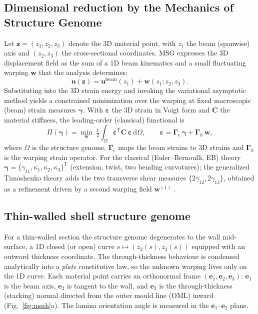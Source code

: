 \documentclass[preprint,12pt]{elsarticle}
\newcommand{\bz}{\bm{z}}
\newcommand{\T}{^{\mathsf{T}}}
\newcommand{\bC}{\mathbf{C}}
\newcommand{\bgamma}{\bm{\gamma}}
\newcommand{\bvarepsilon}{\bm{\varepsilon}}
\begin{document}
\subsection{Dimensional reduction by the Mechanics of Structure Genome}
Let $\bz=(z_1,z_2,z_3)$ denote the 3D material point, with $z_1$ the beam
(spanwise) axis and $(z_2,z_3)$ the cross-sectional coordinates. MSG expresses
the 3D displacement field as the sum of a 1D beam kinematics and a small
fluctuating warping $\bm{w}$ that the analysis determines:
\begin{equation}
\bm{u}(\bz) = \bm{u}^{\text{beam}}(z_1) + \bm{w}(z_1;z_2,z_3).
\end{equation}
Substituting into the 3D strain energy and invoking the variational asymptotic
method yields a constrained minimization over the warping at fixed macroscopic
(beam) strain measures $\bgamma$. With $\bvarepsilon$ the 3D strain in Voigt
form and $\bC$ the material stiffness, the leading-order (classical) functional
is
\begin{equation}
\Pi(\bgamma) = \min_{\bm{w}}\ \tfrac12 \int_{\Omega}
   \bvarepsilon\T \bC\, \bvarepsilon \,\mathrm{d}\Omega,
\qquad
\bvarepsilon = \bm{\Gamma}_{\!e}\,\bgamma + \bm{\Gamma}_{\!h}\,\bm{w},
\label{eq:msg}
\end{equation}
where $\Omega$ is the structure genome, $\bm{\Gamma}_{\!e}$ maps the beam
strains to 3D strains and $\bm{\Gamma}_{\!h}$ is the warping strain operator.
For the classical (Euler--Bernoulli, EB) theory
$\bgamma=\{\gamma_{11},\kappa_1,\kappa_2,\kappa_3\}\T$ (extension, twist, two
bending curvatures); the generalized Timoshenko theory adds the two transverse
shear measures $\{2\gamma_{12},2\gamma_{13}\}$, obtained as a refinement driven
by a second warping field $\bm{w}^{(1)}$ \cite{yu2002}.

\subsection{Thin-walled shell structure genome}
For a thin-walled section the structure genome degenerates to the wall
mid-surface, a 1D closed (or open) curve $s\mapsto(z_2(s),z_3(s))$ equipped
with an outward thickness coordinate. The through-thickness behaviour is
condensed analytically into a \emph{plate} constitutive law, so the unknown
warping lives only on the 1D curve. Each material point carries an orthonormal
frame $(\bm{e}_1,\bm{e}_2,\bm{e}_3)$: $\bm{e}_1$ is the beam axis,
$\bm{e}_2$ is tangent to the wall, and $\bm{e}_3$ is the through-thickness
(stacking) normal directed from the outer mould line (OML) inward
(Fig.~\ref{fig:mesh}a). The lamina orientation angle is measured in the
$\bm{e}_1$--$\bm{e}_2$ plane.
\end{document}
